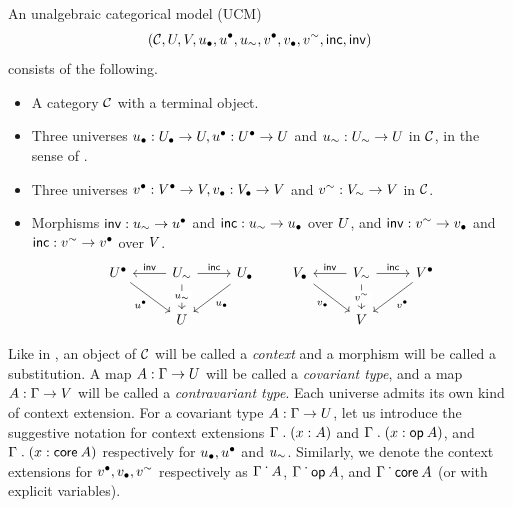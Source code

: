 \begin{definition}
  An unalgebraic categorical model (UCM) 
  \[(\mathcal{C},U,V,{u_\bullet},{u^{\bullet}},{u_\sim},{v^\bullet},{v_\bullet},{v^\sim},\mathop{\mathsf{inc}},\mathop{\mathsf{inv}})\]
  consists of the following.
  \begin{itemize}
  \item A category $\mathcal{C}$ with a terminal object.
  \item Three universes ${u_\bullet} : {U_\bullet} \to U, {u^{\bullet}}:{U^{\bullet}} \to U$ and ${u_\sim} : {U_\sim} \to U$ in $\mathcal{C}$,
    in the sense of .
  \item Three universes ${v^\bullet} : {V^\bullet} \to V, {v_\bullet}:{V_\bullet} \to V$ and ${v^\sim} : {V_\sim} \to V$ in $\mathcal{C}$.
  \item Morphisms $\mathop{\mathsf{inv}} : {u_\sim} \to {u^{\bullet}}$ and $\mathop{\mathsf{inc}} : {u_\sim} \to {u_\bullet}$ over $U$, and
    $\mathop{\mathsf{inv}} : {v^\sim} \to {v_\bullet}$ and $\mathop{\mathsf{inc}} : {v^\sim} \to {v^\bullet}$ over $V$.
    \[
    \begin{tikzcd}
      \Uupp & \Usim & \Ulow \\
      & \U
      \arrow["\uupp"', from=1-1, to=2-2]
      \arrow["\inv"', from=1-2, to=1-1]
      \arrow["\inc", from=1-2, to=1-3]
      \arrow["\usim"{description}, from=1-2, to=2-2]
      \arrow["\ulow", from=1-3, to=2-2]
    \end{tikzcd}
    \quad \quad 
    \begin{tikzcd}
      \Vupp & \Vsim & \Vlow \\
      & \V
      \arrow["\vupp"', from=1-1, to=2-2]
      \arrow["\inv"', from=1-2, to=1-1]
      \arrow["\inc", from=1-2, to=1-3]
      \arrow["\vsim"{description}, from=1-2, to=2-2]
      \arrow["\vlow", from=1-3, to=2-2]
    \end{tikzcd}
    \]
  \end{itemize}
\end{definition}
Like in ,
an object of $\mathcal{C}$ will be called a \emph{context} and a morphism will be called a substitution.
A map $A : \Gamma \to U$ will be called a \emph{covariant type},
and a map $A : \Gamma \to V$ will be called a \emph{contravariant type}.
Each universe admits its own kind of context extension.
For a covariant type $A : \Gamma \to U$,
let us introduce the suggestive notation for context extensions
$\Gamma \mathrel{.} (x : A)$ and $\Gamma \mathrel{.} (x : \mathop{\mathsf{op}_{}} A)$, and $\Gamma \mathrel{.} (x : \mathop{\mathsf{core}_{}} A)$
respectively for ${u_\bullet}, {u^{\bullet}}$ and ${u_\sim}$.
Similarly, we denote the context extensions for ${v^\bullet}, {v_\bullet}, {v^\sim}$
respectively as $\Gamma \mathrel{\dot{\,}} A$, $\Gamma \mathrel{\dot{\,}} \mathop{\mathsf{op}_{}} A$, and $\Gamma \mathrel{\dot{\,}} \mathop{\mathsf{core}_{}} A$
(or with explicit variables).


